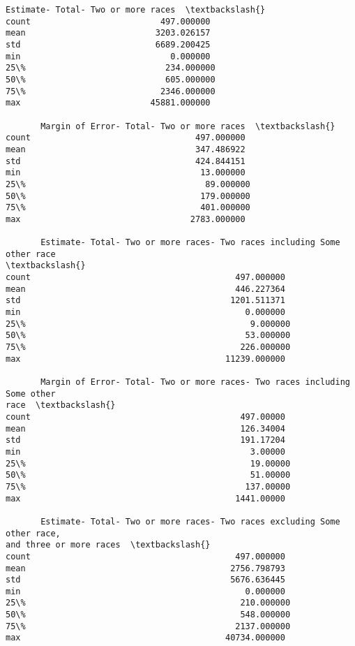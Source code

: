 \documentclass[11pt]{article}
\begin{document}
\begin{tcolorbox}[breakable, size=fbox, boxrule=.5pt, pad at break*=1mm, opacityfill=0]
\begin{Verbatim}[commandchars=\\\{\}]
       Estimate- Total- Two or more races  \textbackslash{}
count                          497.000000
mean                          3203.026157
std                           6689.200425
min                              0.000000
25\%                            234.000000
50\%                            605.000000
75\%                           2346.000000
max                          45881.000000

       Margin of Error- Total- Two or more races  \textbackslash{}
count                                 497.000000
mean                                  347.486922
std                                   424.844151
min                                    13.000000
25\%                                    89.000000
50\%                                   179.000000
75\%                                   401.000000
max                                  2783.000000

       Estimate- Total- Two or more races- Two races including Some other race
\textbackslash{}
count                                         497.000000
mean                                          446.227364
std                                          1201.511371
min                                             0.000000
25\%                                             9.000000
50\%                                            53.000000
75\%                                           226.000000
max                                         11239.000000

       Margin of Error- Total- Two or more races- Two races including Some other
race  \textbackslash{}
count                                          497.00000
mean                                           126.34004
std                                            191.17204
min                                              3.00000
25\%                                             19.00000
50\%                                             51.00000
75\%                                            137.00000
max                                           1441.00000

       Estimate- Total- Two or more races- Two races excluding Some other race,
and three or more races  \textbackslash{}
count                                         497.000000
mean                                         2756.798793
std                                          5676.636445
min                                             0.000000
25\%                                           210.000000
50\%                                           548.000000
75\%                                          2137.000000
max                                         40734.000000


\end{Verbatim}
\end{tcolorbox}
\end{document}
